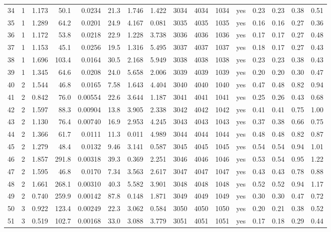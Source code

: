 \begin{table}[tb]
\begin{tabular}{lrrrrrrrrrrcrrrr}
34 & 1 & 1.173 & 50.1 & 0.0234 & 21.3 & 1.746 & 1.422 & 3034 & 4034 & 1034 & yes & 0.23 & 0.23 & 0.38 & 0.51 \\
35 & 1 & 1.289 & 64.2 & 0.0201 & 24.9 & 4.167 & 0.081 & 3035 & 4035 & 1035 & yes & 0.16 & 0.16 & 0.27 & 0.36 \\
36 & 1 & 1.172 & 53.8 & 0.0218 & 22.9 & 1.228 & 3.738 & 3036 & 4036 & 1036 & yes & 0.17 & 0.17 & 0.27 & 0.48 \\
37 & 1 & 1.153 & 45.1 & 0.0256 & 19.5 & 1.316 & 5.495 & 3037 & 4037 & 1037 & yes & 0.18 & 0.17 & 0.27 & 0.43 \\
38 & 1 & 1.696 & 103.4 & 0.0164 & 30.5 & 2.168 & 5.949 & 3038 & 4038 & 1038 & yes & 0.23 & 0.23 & 0.38 & 0.43 \\
39 & 1 & 1.345 & 64.6 & 0.0208 & 24.0 & 5.658 & 2.006 & 3039 & 4039 & 1039 & yes & 0.20 & 0.20 & 0.30 & 0.47 \\
40 & 2 & 1.544 & 46.8 & 0.0165 & 7.58 & 1.643 & 4.404 & 3040 & 4040 & 1040 & yes & 0.47 & 0.48 & 0.82 & 0.94 \\
41 & 2 & 0.842 & 76.0 & 0.00554 & 22.6 & 3.644 & 1.187 & 3041 & 4041 & 1041 & yes & 0.25 & 0.26 & 0.43 & 0.68 \\
42 & 2 & 1.597 & 88.3 & 0.00904 & 13.8 & 3.905 & 2.338 & 3042 & 4042 & 1042 & yes & 0.41 & 0.41 & 0.75 & 1.00 \\
43 & 2 & 1.130 & 76.4 & 0.00740 & 16.9 & 2.953 & 4.245 & 3043 & 4043 & 1043 & yes & 0.37 & 0.38 & 0.66 & 0.75 \\
44 & 2 & 1.366 & 61.7 & 0.0111 & 11.3 & 0.011 & 4.989 & 3044 & 4044 & 1044 & yes & 0.48 & 0.48 & 0.82 & 0.87 \\
45 & 2 & 1.279 & 48.4 & 0.0132 & 9.46 & 3.141 & 0.587 & 3045 & 4045 & 1045 & yes & 0.54 & 0.54 & 0.94 & 1.01 \\
46 & 2 & 1.857 & 291.8 & 0.00318 & 39.3 & 0.369 & 2.251 & 3046 & 4046 & 1046 & yes & 0.53 & 0.54 & 0.95 & 1.22 \\
47 & 2 & 1.595 & 46.8 & 0.0170 & 7.34 & 3.563 & 2.617 & 3047 & 4047 & 1047 & yes & 0.43 & 0.43 & 0.78 & 0.88 \\
48 & 2 & 1.661 & 268.1 & 0.00310 & 40.3 & 5.582 & 3.901 & 3048 & 4048 & 1048 & yes & 0.52 & 0.52 & 0.94 & 1.17 \\
49 & 2 & 0.740 & 259.9 & 0.00142 & 87.8 & 0.148 & 1.871 & 3049 & 4049 & 1049 & yes & 0.30 & 0.30 & 0.47 & 0.72 \\
50 & 3 & 0.922 & 123.4 & 0.00249 & 22.3 & 3.062 & 0.584 & 3050 & 4050 & 1050 & yes & 0.20 & 0.21 & 0.38 & 0.52 \\
51 & 3 & 0.519 & 102.7 & 0.00168 & 33.0 & 3.088 & 3.779 & 3051 & 4051 & 1051 & yes & 0.17 & 0.18 & 0.29 & 0.44 \\

\end{tabular}
\end{table}
